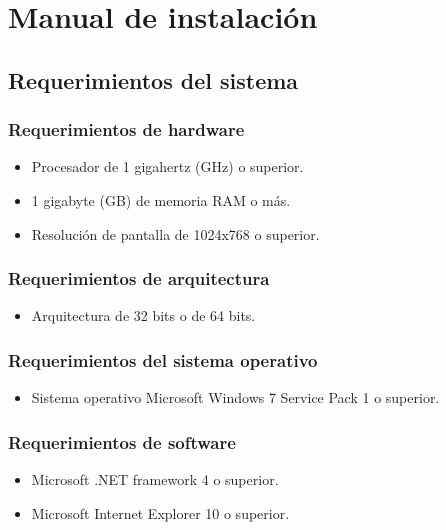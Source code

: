 \appendix
\clearpage
\addappheadtotoc
\appendixpage

\chapter{Manual de instalaci\'{o}n}
\thispagestyle{fancy}
\section*{Requerimientos del sistema}

\subsection*{Requerimientos de hardware}

	\begin{itemize}
		\item Procesador de 1 gigahertz (GHz) o superior.
		
		\item 1 gigabyte (GB) de memoria RAM o m\'{a}s.
		
		\item Resoluci\'{o}n de pantalla de 1024x768 o superior.
	\end{itemize}
	
\subsection*{Requerimientos de arquitectura}

	\begin{itemize}
		\item Arquitectura de 32 bits o de 64 bits.
	\end{itemize}

\subsection*{Requerimientos del sistema operativo}

	\begin{itemize}
		\item Sistema operativo Microsoft Windows 7 Service Pack 1 o superior.
	\end{itemize}
	
\subsection*{Requerimientos de software}

	\begin{itemize}
		\item Microsoft .NET framework 4 o superior.
		
		\item Microsoft Internet Explorer 10 o superior.
	\end{itemize}

